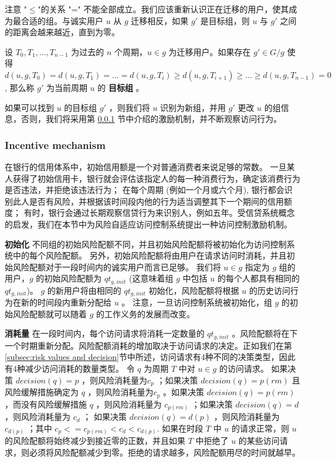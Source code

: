 注意 "$\leq$"的关系 "=" 不能全部成立。我们应该重新认识正在迁移的用户，使其成为最合适的组。与诚实用户 $u$ 从 $g$ 迁移相反，如果 $g'$ 是目标组，则 $u$ 与 $g'$ 之间的距离会越来越近，直到为零。

\begin{definition}%
	\label{def:target group}
	设 $T_0,T_1,...,T_{n-1}$ 为过去的 $n$ 个周期，$u \in g$ 为迁移用户。如果存在 $g' \in G/g$ 使得 $d(u,g,T_0) = d(u,g,T_1) = ... = d(u,g,T_i) \geq d(u,g,T_{i+1}) \geq ... \geq d(u,g,T_{n-1}) = 0$, 那么称 $g'$ 为当前周期 $u$ 的 \textbf{目标组} 。 
\end{definition}

如果可以找到 $u$ 的目标组 $g'$ ，则我们将 $u$ 识别为新组，并用 $g'$ 更改 $u$ 的组信息，否则，我们将采用第 \ref{subsec:Incentive mechanism} 节中介绍的激励机制，并不断观察访问行为。

\subsubsection{Incentive mechanism}
\label{subsec:Incentive mechanism}

在银行的信用体系中，初始信用额是一个对普通消费者来说足够的常数。 一旦某人获得了初始信用卡，银行就会评估该指定人的每一种消费行为，确定该消费行为是否违法，并拒绝该违法行为； 在每个周期 (例如一个月或六个月), 银行都会识别此人是否有风险，并根据该时间段内他的行为适当调整其下一个期间的信用额度； 有时，银行会通过长期观察信贷行为来识别人，例如五年。受信贷系统概念的启发，我们在本节中为风险自适应访问控制系统提出一种访问控制激励机制。

\textbf{初始化} 不同组的初始风险配额不同，并且初始风险配额将被初始化为访问控制系统中的每个风险配额。 另外，初始风险配额将由用户在请求访问时消耗，并且初始风险配额对于一段时间内的诚实用户而言已足够。 我们将 $u \in g$ 指定为 $g$ 组的用户，$g$ 的初始风险配额为 $qt_{g,init}$ (这意味着组 $g$ 中包括 $u$ 的每个人都具有相同的 $qt_{g,init}$)。 $g$ 的新用户将由相同的 $qt_{g,init}$ 初始化，风险配额将根据 $u$ 的历史访问行为在新的时间段内重新分配给 $u$ 。 注意，一旦访问控制系统被初始化，组 $g$ 的初始风险配额就可以随着 $g$ 的工作义务的发展而改变。

\textbf{消耗量} 在一段时间内，每个访问请求将消耗一定数量的 $qt_{g,init}$ 。风险配额将在下一个时期重新分配。风险配额消耗的增加取决于访问请求的决定。正如我们在第 \ref{subsec:risk values and decision}节中所述，访问请求有4种不同的决策类型，因此有4种减少访问消耗的数量类型。 令 $q$ 为周期 $T$ 中对 $u \in g$ 的访问请求。 如果决策 $decision(q)=p$ ，则风险消耗量为$c_p$ ；如果决策 $decision(q)=p(rm)$ 且风险缓解措施确定为 $q$ ，则风险消耗量为$c_p$ 。如果决策 $decision(q)=p(rm)$ ，而没有风险缓解措施 $q$ ，则风险消耗量为 $c_{p(rm)}$ ；如果决策 $decision(q)=d$ ，则风险消耗量为 $c_d$ ； 如果决策 $decision(q)=d(p)$ ，则风险消耗量为 $c_{d(p)}$ ；其中 $c_p <= c_{p(rm)} < c_d < c_{d(p)}$. 如果在时段 $T$ 中 $u$ 的请求正常，则 $u$ 的风险配额将始终减少到接近零的正数，并且如果 $T$ 中拒绝了 $u$ 的某些访问请求，则必须将风险配额减少到零。拒绝的请求越多，风险配额用尽的时间就越早。

